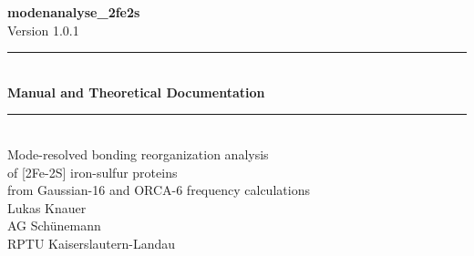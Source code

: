 \documentclass[11pt,a4paper,twoside]{article}
\theoremstyle{remark}
\begin{document}
\begin{titlepage}
  \begin{center}
    \vspace*{2cm}
    {\Huge\bfseries\color{accent} modenanalyse\_2fe2s}\\[0.4cm]
    {\large Version 1.0.1}\\[2cm]

    \rule{\textwidth}{0.4pt}\\[0.3cm]
    {\LARGE\bfseries Manual and Theoretical Documentation}\\[0.3cm]
    \rule{\textwidth}{0.4pt}\\[1cm]

    {\large
      Mode-resolved bonding reorganization analysis\\
      of {[}2Fe-2S{]} iron-sulfur proteins\\
      from Gaussian-16 and ORCA-6 frequency calculations
    }\\[1.5cm]

    {\large
      Lukas Knauer\\
      AG Sch\"unemann\\
      RPTU Kaiserslautern-Landau
    }\\[1.5cm]


\end{center}
\end{titlepage}
\end{document}
